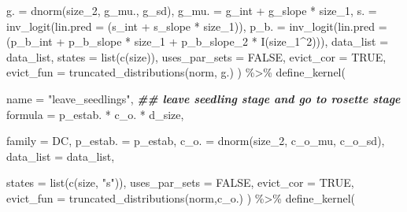 \documentclass[
]{article}
\newenvironment{Shaded}{\begin{snugshade}}{\end{snugshade}}
\newcommand{\AttributeTok}[1]{\textcolor[rgb]{0.77,0.63,0.00}{#1}}
\newcommand{\ConstantTok}[1]{\textcolor[rgb]{0.00,0.00,0.00}{#1}}
\newcommand{\DecValTok}[1]{\textcolor[rgb]{0.00,0.00,0.81}{#1}}
\newcommand{\DocumentationTok}[1]{\textcolor[rgb]{0.56,0.35,0.01}{\textbf{\textit{#1}}}}
\newcommand{\FunctionTok}[1]{\textcolor[rgb]{0.00,0.00,0.00}{#1}}
\newcommand{\NormalTok}[1]{#1}
\newcommand{\SpecialCharTok}[1]{\textcolor[rgb]{0.00,0.00,0.00}{#1}}
\newcommand{\StringTok}[1]{\textcolor[rgb]{0.31,0.60,0.02}{#1}}
\begin{document}
\begin{Shaded}
\begin{Highlighting}[]
    \AttributeTok{g.            =} \FunctionTok{dnorm}\NormalTok{(size\_2, g\_mu., g\_sd),}
    \AttributeTok{g\_mu.          =}\NormalTok{ g\_int }\SpecialCharTok{+}\NormalTok{ g\_slope }\SpecialCharTok{*}\NormalTok{ size\_1,}
    \AttributeTok{s.            =} \FunctionTok{inv\_logit}\NormalTok{(}\AttributeTok{lin.pred =}\NormalTok{ (s\_int }\SpecialCharTok{+}\NormalTok{ s\_slope }\SpecialCharTok{*}\NormalTok{ size\_1)),}
    \AttributeTok{p\_b.          =} \FunctionTok{inv\_logit}\NormalTok{(}\AttributeTok{lin.pred =}\NormalTok{ (p\_b\_int }\SpecialCharTok{+}\NormalTok{ p\_b\_slope }\SpecialCharTok{*}\NormalTok{ size\_1 }\SpecialCharTok{+}\NormalTok{ p\_b\_slope\_2 }\SpecialCharTok{*} \FunctionTok{I}\NormalTok{(size\_1}\SpecialCharTok{\^{}}\DecValTok{2}\NormalTok{))),}
    \AttributeTok{data\_list     =}\NormalTok{ data\_list,}
    \AttributeTok{states        =} \FunctionTok{list}\NormalTok{(}\FunctionTok{c}\NormalTok{(}\StringTok{\textquotesingle{}size\textquotesingle{}}\NormalTok{)),}
    \AttributeTok{uses\_par\_sets =} \ConstantTok{FALSE}\NormalTok{,}
    \AttributeTok{evict\_cor     =} \ConstantTok{TRUE}\NormalTok{,}
    \AttributeTok{evict\_fun     =} \FunctionTok{truncated\_distributions}\NormalTok{(}\StringTok{\textquotesingle{}norm\textquotesingle{}}\NormalTok{, }\StringTok{\textquotesingle{}g.\textquotesingle{}}\NormalTok{)}
\NormalTok{) }\SpecialCharTok{\%\textgreater{}\%}
  \FunctionTok{define\_kernel}\NormalTok{(}
    
    \AttributeTok{name          =} \StringTok{"leave\_seedlings"}\NormalTok{, }\DocumentationTok{\#\# leave seedling stage and go to rosette stage}
    \AttributeTok{formula       =}\NormalTok{ p\_estab. }\SpecialCharTok{*}\NormalTok{ c\_o. }\SpecialCharTok{*}\NormalTok{ d\_size,}
    
    \AttributeTok{family        =} \StringTok{\textquotesingle{}DC\textquotesingle{}}\NormalTok{,}
    \AttributeTok{p\_estab.      =}\NormalTok{ p\_estab,}
    \AttributeTok{c\_o.          =} \FunctionTok{dnorm}\NormalTok{(size\_2, c\_o\_mu, c\_o\_sd),}
    \AttributeTok{data\_list     =}\NormalTok{ data\_list,}
   
    \AttributeTok{states        =} \FunctionTok{list}\NormalTok{(}\FunctionTok{c}\NormalTok{(}\StringTok{\textquotesingle{}size\textquotesingle{}}\NormalTok{, }\StringTok{"s"}\NormalTok{)),}
    \AttributeTok{uses\_par\_sets =} \ConstantTok{FALSE}\NormalTok{,}
    \AttributeTok{evict\_cor     =} \ConstantTok{TRUE}\NormalTok{,}
    \AttributeTok{evict\_fun     =} \FunctionTok{truncated\_distributions}\NormalTok{(}\StringTok{\textquotesingle{}norm\textquotesingle{}}\NormalTok{,}\StringTok{\textquotesingle{}c\_o.\textquotesingle{}}\NormalTok{)}
\NormalTok{) }\SpecialCharTok{\%\textgreater{}\%}
  \FunctionTok{define\_kernel}\NormalTok{(}
    

\end{Highlighting}
\end{Shaded}
\end{document}
